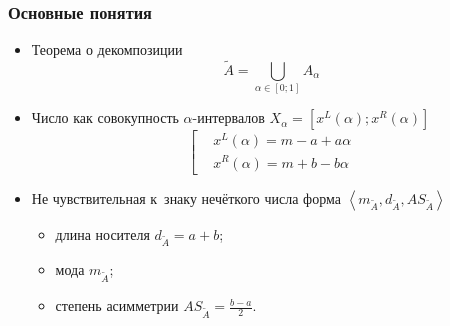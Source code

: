 \documentclass[12pt]{beamer}
\begin{document}
\begin{frame}
  \frametitle{Основные понятия}
  \begin{itemize}
    \item Теорема о декомпозиции 
      \begin{equation}
        \tilde{A}=\bigcup\limits_{\alpha \in \left[ 0;1 \right]}{A_\alpha}
      \end{equation}
    \item Число как совокупность $\alpha$-интервалов $X_\alpha = \left[x^L(\alpha); x^R(\alpha) \right]$
      \begin{equation}
        \left[ 
          \begin{aligned}
            & x^L(\alpha )=m-a+a\alpha  \\ 
            & x^R(\alpha )=m+b-b\alpha
          \end{aligned}
        \right.
      \end{equation}
    \item Не чувствительная к~знаку нечёткого числа форма $\left\langle m_{\tilde A}, d_{\tilde A}, AS_{\tilde A} \right\rangle$
      \begin{itemize}
        \item длина носителя $d_{\tilde A} = a+b$;
        \item мода $m_{\tilde A}$;
        \item степень асимметрии $\displaystyle AS_{\tilde A} = \frac{b-a}{2}$.
      \end{itemize}
  \end{itemize}
\end{frame}
\end{document}
